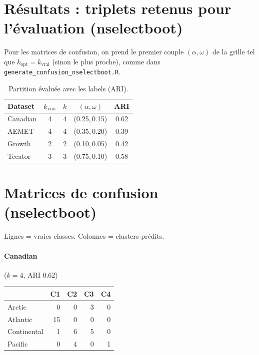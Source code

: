 \documentclass[11pt, a4paper]{article}
\begin{document}
\section{Résultats : triplets retenus pour l'évaluation (nselectboot)}

Pour les matrices de confusion, on prend le premier couple $(\alpha,\omega)$ de
la grille tel que $k_\text{opt} = k_{\mathrm{vrai}}$ (sinon le plus proche), comme
dans \texttt{generate\_confusion\_nselectboot.R}.

\begin{table}[H]
\centering
\renewcommand{\arraystretch}{1.3}
\small
\begin{tabular}{lcccc}
\toprule
\textbf{Dataset} & $k_{\mathrm{vrai}}$ & $k$ & $(\alpha,\omega)$ & ARI \\
\midrule
Canadian & 4 & 4 & (0.25,\,0.15) & 0.62 \\
AEMET    & 4 & 4 & (0.35,\,0.20) & 0.39 \\
Growth   & 2 & 2 & (0.10,\,0.05) & 0.42 \\
Tecator  & 3 & 3 & (0.75,\,0.10) & 0.58 \\
\bottomrule
\end{tabular}
\caption{Partition évaluée avec les labels (ARI).}
\label{tab:nselectboot}
\end{table}

\section{Matrices de confusion (nselectboot)}

Lignes = vraies classes. Colonnes = clusters prédits.

\paragraph{Canadian} ($k=4$, ARI 0.62)
\begin{center}
\small
\begin{tabular}{lrrrr}
\toprule
& C1 & C2 & C3 & C4 \\
\midrule
Arctic & 0 & 0 & 3 & 0 \\
Atlantic & 15 & 0 & 0 & 0 \\
Continental & 1 & 6 & 5 & 0 \\
Pacific & 0 & 4 & 0 & 1 \\
\bottomrule
\end{tabular}
\end{center}
\end{document}

